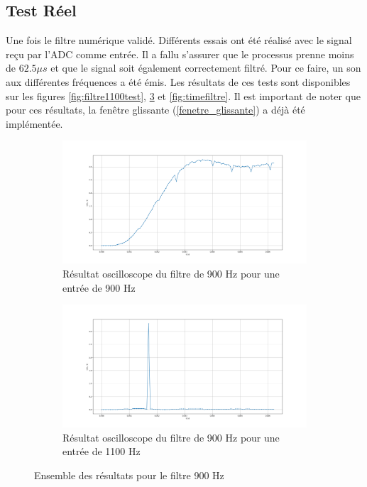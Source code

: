 \subsection{Test Réel}
Une fois le filtre numérique validé. Différents essais ont été réalisé avec le signal reçu par l'ADC comme entrée. Il a fallu s'assurer que le processus prenne moins de $62.5 \mu s$ et que le signal soit également correctement filtré. Pour ce faire, un son aux différentes fréquences a été émis. Les résultats de ces tests sont disponibles sur les figures \ref{fig:filtre1100test}, \ref{fig:filtre900test} et \ref{fig:timefiltre}. Il est important de noter que pour ces résultats, la fenêtre glissante (\ref{fenetre_glissante}) a déjà été implémentée.

\begin{figure}[H]
    \centering
    \begin{subfigure}[b]{\textwidth}
        \centering
        \includegraphics[width=\textwidth]{Pictures/fil900-900.png}
        \caption{Résultat oscilloscope du filtre de 900 Hz pour une entrée de 900 Hz}
        \label{fig:900-900}
    \end{subfigure}
    \begin{subfigure}[b]{\textwidth}
        \centering
        \includegraphics[width=\textwidth]{Pictures/fil900-1100.png}
        \caption{Résultat oscilloscope du filtre de 900 Hz pour une entrée de 1100 Hz}
        \label{fig:900-1100}
    \end{subfigure}
    \caption{Ensemble des résultats pour le filtre 900 Hz}
    \label{fig:filtre900test}
\end{figure}


